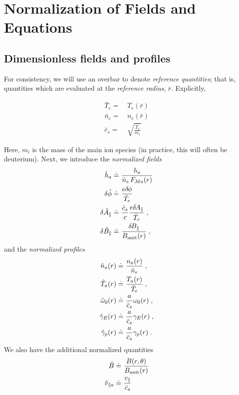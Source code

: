 \chapter{Normalization of Fields and Equations}

\section{Dimensionless fields and profiles}

For consistency, we will use an overbar to denote {\it 
reference quantities}; that is, quantities which are 
evaluated at the {\it reference radius}, $\bar{r}$.
Explicitly, 

\begin{align}
\bar{T}_e = &~T_e(\bar{r}) \\
\bar{n}_e = &~n_e(\bar{r}) \\
\bar{c}_s = &~\sqrt{\frac{\bar{T}_e}{m_i}}
\end{align}

\noindent
Here, $m_i$ is the mass of the main ion species (in practice, 
this will often be deuterium).  Next, we introduce the 
{\it normalized fields}
%
\begin{align}
\hat{h}_a     \doteq &~\frac{h_a}{\bar{n}_e \, F_{Ma}(r)} \\
\delta \hat{\phi} \doteq &~\frac{e \delta \hskip -1pt \phi}{\bar{T}_e} \\
\delta \hat{A}_\parallel \doteq &~ 
  \frac{\bar{c}_s}{c} \frac{e \delta \hskip -1pt A_\parallel}{\bar{T}_e} \; , \\
\delta \hat{B}_\parallel \doteq &~ 
   \frac{\delta \hskip -1pt B_\parallel}{B_{\rm unit}(r)} \; ,
\end{align}
%
and the {\it normalized profiles}
%
\begin{align}
\hat{n}_a(r) \doteq &~\frac{n_a(r)}{\bar{n}_e} \; , \\
\hat{T}_a(r) \doteq &~\frac{T_a(r)}{\bar{T}_e} \; , \\
\hat{\omega}_0(r) \doteq &~\frac{a}{\bar{c}_s} \omega_0(r) \; , \\
\hat{\gamma}_E(r) \doteq &~\frac{a}{\bar{c}_s} \gamma_E(r) \; , \\
\hat{\gamma}_p(r) \doteq &~\frac{a}{\bar{c}_s} \gamma_p(r) \; .
\end{align}
%
We also have the additional normalized quantities
%
\begin{align}
\hat{B}       \doteq &~\frac{B(r,\theta)}{B_{\rm unit}(r)} \\
\hat{v}_{\parallel a}      \doteq &~\frac{v_\parallel}{\bar{c}_s} 
\end{align}


